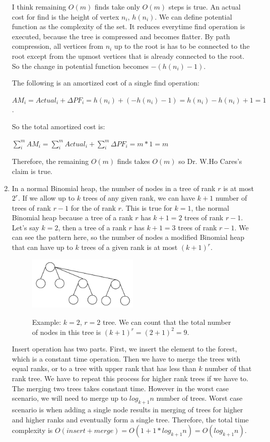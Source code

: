 \documentclass{article}
\begin{document}
\begin{enumerate}
  I think remaining $O(m)$ finds take only $O(m)$ steps is true.
  An actual cost for find is the height of vertex $n_i$, $h(n_i)$.
  We can define potential function as the complexity of the set.
  It reduces everytime find operation is executed, because the tree is compressed and becomes flatter.
  By path compression, all vertices from $n_i$ up to the root is has to be connected to the root except from the upmost vertices that is already connected to the root.
  So the change in potential function becomes $-(h(n_i)-1)$.

  The following is an amortized cost of a single find operation:

  $AM_i=Actual_i+\Delta PF_i=h(n_i)+(-h(n_i)-1)=h(n_i)-h(n_i)+1=1$.

  So the total amortized cost is:

  $\sum_{i}^{m} AM_i = \sum_{i}^{m} Actual_i+\sum_{i}^{m} \Delta PF_i=m*1=m$

  Therefore, the remaining $O(m)$ finds takes $O(m)$ so Dr. W.Ho Cares's claim is true.

  \item In a normal Binomial heap, the number of nodes in a tree of rank $r$ is at most $2^r$.
  If we allow up to $k$ trees of any given rank, we can have $k+1$ number of trees of rank $r-1$ for the of rank $r$.
  This is true for $k=1$, the normal Binomial heap because a tree of a rank $r$ has $k+1=2$ trees of rank $r-1$.
  Let's say $k=2$, then a tree of a rank $r$ has $k+1=3$ trees of rank $r-1$.
  We can see the pattern here, so the number of nodes a modified Binomial heap that can have up to $k$ trees of a given rank is at most $(k+1)^r$.

  \begin{figure}[H]
    \centering
    \includegraphics[width=0.5\textwidth]{image1.png}
    \begin{minipage}{0.5\textwidth}
        \centering
        Example: $k=2$, $r=2$ tree. We can count that the total number of nodes in this tree is $(k+1)^r=(2+1)^2=9.$
    \end{minipage}
  \end{figure}

  Insert operation has two parts. First, we insert the element to the forest, which is a constant time operation.
  Then we have to merge the trees with equal ranks, or to a tree with upper rank that has less than $k$ number of that rank tree.
  We have to repeat this process for higher rank trees if we have to.
  The merging two trees takes constant time. However in the worst case scenario, we will need to merge up to $log_{k+1}n$ number of trees.
  Worst case scenario is when adding a single node results in merging of trees for higher and higher ranks and eventually form a single tree.
  Therefore, the total time complexity is $O(insert+merge)=O(1+1*log_{k+1}n)=O(log_{k+1}n)$.


\end{enumerate}
\end{document}
